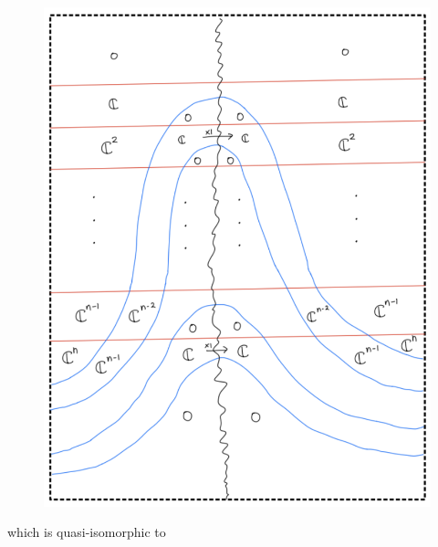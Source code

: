 \begin{figure}[H]
    \centering
    \includegraphics[scale = 0.95]{diagrams/cobord_inter/0.png}
    \caption{}
    \label{fig:your-label}
\end{figure}

which is quasi-isomorphic to

